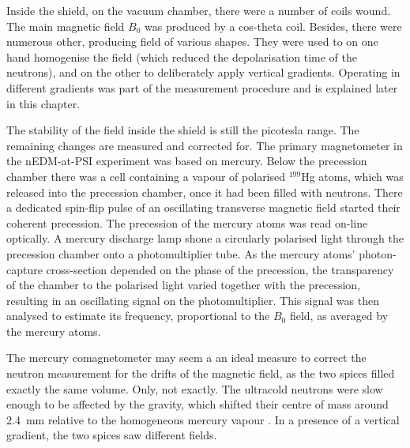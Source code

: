 Inside the shield, on the vacuum chamber, there were a number of coils wound. The main magnetic field $B_0$ was produced by a cos-theta coil. Besides, there were numerous other, producing field of various shapes.
They were used to on one hand homogenise the field (which reduced the depolarisation time of the neutrons),
and on the other to deliberately apply vertical gradients. Operating in different gradients was part of the measurement procedure and is explained later in this chapter.

The stability of the field inside the shield is still the picotesla range. The remaining changes are measured and corrected for. The primary magnetometer in the nEDM-at-PSI experiment was based on mercury. Below the precession chamber there was a cell containing a vapour of polarised $^{199}$Hg atoms, which was released into the precession chamber, once it had been filled with neutrons.
There a dedicated spin-flip pulse of an oscillating transverse magnetic field started their coherent precession. The precession of the mercury atoms was read on-line optically. A mercury discharge lamp shone a circularly polarised light through the precession chamber onto a photomultiplier tube. As the mercury atoms' photon-capture cross-section depended on the phase of the precession, the transparency of the chamber to the polarised light varied together with the precession, resulting in an oscillating signal on the photomultiplier. This signal was then analysed to estimate its frequency, proportional to the $B_0$ field, as averaged by the mercury atoms.

The mercury comagnetometer may seem a an ideal measure to correct the neutron measurement for the drifts of the magnetic field, as the two spices filled exactly the same volume. Only, not exactly. The ultracold neutrons were slow enough to be affected by the gravity, which shifted their centre of mass around \SI{2.4}{\milli\meter} relative to the homogeneous mercury vapour . In a presence of a vertical gradient, the two spices saw different fields.

